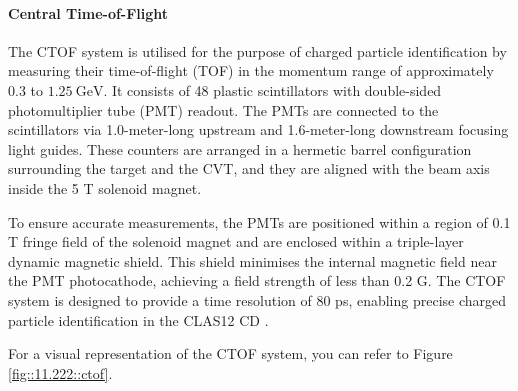 \paragraph{Central Time-of-Flight}
    The CTOF system is utilised for the purpose of charged particle identification by measuring their time-of-flight (TOF) in the momentum range of approximately $0.3$ to $1.25 ~\text{GeV}$.
    It consists of 48 plastic scintillators with double-sided photomultiplier tube (PMT) readout.
    The PMTs are connected to the scintillators via 1.0-meter-long upstream and 1.6-meter-long downstream focusing light guides.
    These counters are arranged in a hermetic barrel configuration surrounding the target and the CVT, and they are aligned with the beam axis inside the 5 T solenoid magnet.

    To ensure accurate measurements, the PMTs are positioned within a region of 0.1 T fringe field of the solenoid magnet and are enclosed within a triple-layer dynamic magnetic shield.
    This shield minimises the internal magnetic field near the PMT photocathode, achieving a field strength of less than 0.2 G.
    The CTOF system is designed to provide a time resolution of 80 ps, enabling precise charged particle identification in the CLAS12 CD \cite{carman2020ctof}.

    For a visual representation of the CTOF system, you can refer to Figure \ref{fig::11.222::ctof}.
